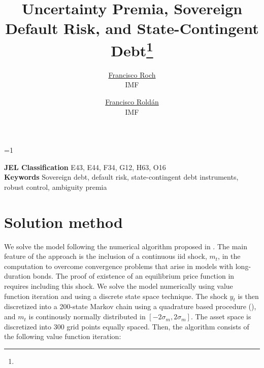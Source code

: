 \documentclass[letterpaper,12pt]{article}
\title{Uncertainty Premia, Sovereign Default Risk, and State-Contingent Debt\thanks{\acknotitle}}
\author{
\href{https://sites.google.com/site/franroch/}{\color{mDarkTeal}Francisco Roch}\\{ IMF}
\and
\href{https://fqroldan.github.io}{\color{mDarkTeal}Francisco Roldán}\\{ IMF}
}
\date{%
\monthname\xspace \the\year%
}
\def\ungated{1}
\begin{document}
\fontsize{12.0pt}{25.0pt} \selectfont

\ifnum\ungated=1%
  \maketitle
  \begin{abstract}
  \noindent%
  \fontsize{12.0pt}{18.0pt}\selectfont%
  
  \end{abstract}
  \renewcommand{\thefootnote}{\fnsymbol{footnote}} \renewcommand{%
  \thefootnote}{\arabic{footnote}} %
  \thispagestyle{empty} \setcounter{page}{0}
  \fontsize{12.0pt}{25.0pt} \selectfont
  \vfill
  \noindent\textbf{JEL Classification} \quad E43, E44, F34, G12, H63, O16 \\
  \noindent\textbf{Keywords} \quad Sovereign debt, default risk, state-contingent debt instruments, robust control, ambiguity premia
  \vfill
\else
  
  \tableofcontents
\fi


\newpage








\newpage
\linespread{1.0}




\newpage
\appendix{} \newpage {}
\bigskip {}{}

\appendix
\section{Solution method}\label{app:algorithm}

We solve the model following the numerical algorithm proposed in \cite{Chatty}. The main feature of the approach is the inclusion of a continuous iid shock, $m_t$, in the computation to overcome convergence problems that arise in models with long-duration bonds. The proof of existence of an equilibrium price function in \cite{Chatty} requires including this shock. We solve the model numerically using value function iteration and using a discrete state space technique. The shock $y_t$ is then discretized into a 200-state Markov chain using a quadrature based procedure (\citealp{Tauchen}), and $m_t$ is continously normally distributed in $[-2\sigma_m, 2\sigma_m]$. The asset space is discretized into 300 grid points equally spaced. Then, the algorithm consists of the following value function iteration:
\end{document}
